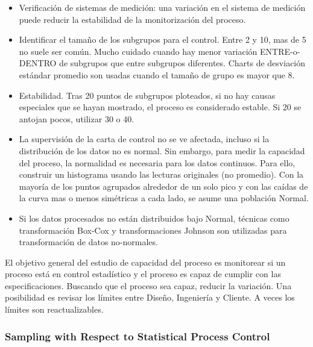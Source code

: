 \documentclass[]{article}
\begin{document}
\begin{itemize}
	\item Verificación de sistemas de medición: una variación en el sistema de medición puede reducir la estabilidad de la monitorización del proceso. 
	\item Identificar el tamaño de los subgrupos para el control. Entre 2 y 10, mas de 5 no suele ser común. Mucho cuidado cuando hay menor variación ENTRE-o-DENTRO de subgrupos que entre subgrupos diferentes. Charts de desviación estándar promedio son usadas cuando el tamaño de grupo es mayor que 8.
	\item Estabilidad. Tras 20 puntos de subgrupos ploteados, si no hay causas especiales que se hayan mostrado, el proceso es considerado estable. Si 20 se antojan pocos, utilizar 30 o 40.
	\item La supervisión de la carta de control no se ve afectada, incluso si la distribución de los datos no es normal. Sin embargo, para medir la capacidad del proceso, la normalidad es necesaria para los datos continuos. \newline Para ello, construir un histograma usando las lecturas originales (no promedio). Con la mayoría de los puntos agrupados alrededor de un solo pico y con las caídas de la curva mas o menos simétricas a cada lado, se asume una población Normal.
	\item Si los datos procesados no están distribuidos bajo Normal, técnicas como transformación Box-Cox y transformaciones Johnson son utilizadas para transformación de datos no-normales.
\end{itemize}

El objetivo general del estudio de capacidad del proceso es monitorear si un proceso está en control estadístico y el proceso es capaz de cumplir con las especificaciones. Buscando que el proceso sea capaz, reducir la variación. Una posibilidad es revisar los límites entre Diseño, Ingeniería y Cliente. A veces los límites son reactualizables.

\subsubsection{Sampling with Respect to Statistical Process Control}
\end{document}
